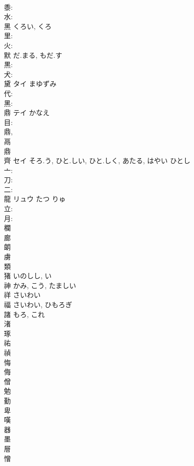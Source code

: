 \documentclass[8pt]{extreport}
\begin{document}
\begin{CJK}{UTF8}{min}
\\	黍: 
\\	水: 
\\	黑		くろい, くろ				
\\	里: 
\\	火: 
\\	默		だ.まる, もだ.す				
\\	黒: 
\\	犬: 
\\	黛	タイ	まゆずみ		
\\	代: 
\\	黑: 
\\	鼎	テイ	かなえ		
\\	目: 
\\	鼎, 
\\	鬲 
\\	鼎 
\\	齊	セイ	そろ.う, ひと.しい, ひと.しく, あたる, はやい	ひとし	
\\	亠: 
\\	刀: 
\\	二: 
\\	龍	リュウ	たつ	りゅ	
\\	立: 
\\	月: 
\\	欄						
\\	廊						
\\	朗						
\\	虜						
\\	類						
\\	猪		いのしし, い				
\\	神		かみ, こう, たましい				
\\	祥		さいわい				
\\	福		さいわい, ひもろぎ				
\\	諸		もろ, これ				
\\	渚						
\\	琢						
\\	祐						
\\	禎						
\\	悔						
\\	侮						
\\	僧						
\\	勉						
\\	勤						
\\	卑						
\\	嘆						
\\	器						
\\	墨						
\\	層						
\\	憎						

\end{CJK}
\end{document}
